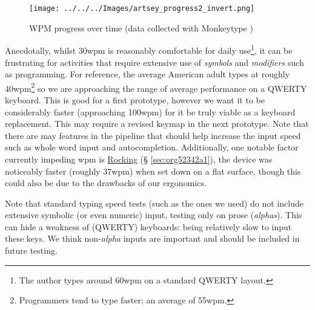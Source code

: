 \documentclass[logo,bsc,singlespacing,parskip]{infthesis}
\begin{document}
\begin{figure}[h]
\centering
\texttt{[image: ../../../Images/artsey\_progress2\_invert.png]}
\caption[WPM progress over time]{\label{fig:wpm}WPM progress over time (data collected with Monkeytype \autocite{miodecMonkeytype})}
\end{figure}

Anecdotally, whilst 30wpm is reasonably comfortable for daily use\footnote{The author types around 60wpm on a standard QWERTY layout.}, it can be frustrating for activities that require extensive use of \emph{symbols} and \emph{modifiers} such as programming.
For reference, the average American adult types at roughly 40wpm\footnote{Programmers tend to type faster; an average of 55wpm.} \autocite{WhatAverageTyping} so we are approaching the range of average performance on a QWERTY keyboard.
This is good for a first prototype, however we want it to be considerably faster (approaching 100wpm) for it be truly viable as a keyboard replacement.
This may require a revised keymap in the next prototype.
Note that there are may features in the pipeline that should help increase the input speed such as whole word input and autocompletion.
Additionally, one notable factor currently impeding wpm is
\hyperref[sec:org52342a1]{Rocking} (§ \ref{sec:org52342a1}),  the device was noticeably faster (roughly 37wpm) when set down on a flat surface, though this could also be due to the drawbacks of our ergonomics. \medskip

Note that standard typing speed tests (such as the ones we used) do not include extensive symbolic (or even numeric) input, testing only on prose (\emph{alphas}). This can hide a weakness of (QWERTY) keyboards: being relatively slow to input these keys. We think non-\emph{alpha} inputs are important and should be included in future testing.
\end{document}
